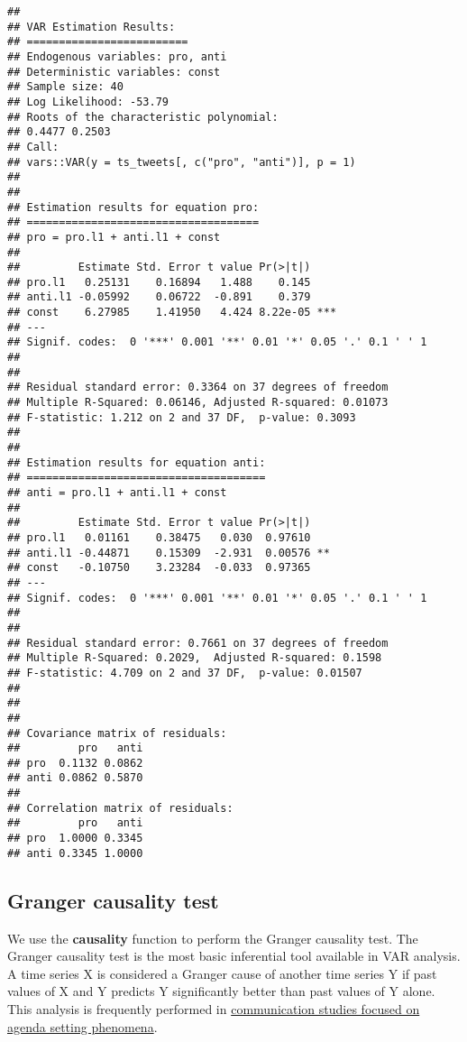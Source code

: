 \documentclass[
]{article}
\begin{document}
\begin{verbatim}
## 
## VAR Estimation Results:
## ========================= 
## Endogenous variables: pro, anti 
## Deterministic variables: const 
## Sample size: 40 
## Log Likelihood: -53.79 
## Roots of the characteristic polynomial:
## 0.4477 0.2503
## Call:
## vars::VAR(y = ts_tweets[, c("pro", "anti")], p = 1)
## 
## 
## Estimation results for equation pro: 
## ==================================== 
## pro = pro.l1 + anti.l1 + const 
## 
##         Estimate Std. Error t value Pr(>|t|)    
## pro.l1   0.25131    0.16894   1.488    0.145    
## anti.l1 -0.05992    0.06722  -0.891    0.379    
## const    6.27985    1.41950   4.424 8.22e-05 ***
## ---
## Signif. codes:  0 '***' 0.001 '**' 0.01 '*' 0.05 '.' 0.1 ' ' 1
## 
## 
## Residual standard error: 0.3364 on 37 degrees of freedom
## Multiple R-Squared: 0.06146, Adjusted R-squared: 0.01073 
## F-statistic: 1.212 on 2 and 37 DF,  p-value: 0.3093 
## 
## 
## Estimation results for equation anti: 
## ===================================== 
## anti = pro.l1 + anti.l1 + const 
## 
##         Estimate Std. Error t value Pr(>|t|)   
## pro.l1   0.01161    0.38475   0.030  0.97610   
## anti.l1 -0.44871    0.15309  -2.931  0.00576 **
## const   -0.10750    3.23284  -0.033  0.97365   
## ---
## Signif. codes:  0 '***' 0.001 '**' 0.01 '*' 0.05 '.' 0.1 ' ' 1
## 
## 
## Residual standard error: 0.7661 on 37 degrees of freedom
## Multiple R-Squared: 0.2029,  Adjusted R-squared: 0.1598 
## F-statistic: 4.709 on 2 and 37 DF,  p-value: 0.01507 
## 
## 
## 
## Covariance matrix of residuals:
##         pro   anti
## pro  0.1132 0.0862
## anti 0.0862 0.5870
## 
## Correlation matrix of residuals:
##         pro   anti
## pro  1.0000 0.3345
## anti 0.3345 1.0000
\end{verbatim}

\subsection{Granger causality test}\label{granger-causality-test}

We use the \textbf{causality} function to perform the Granger causality test. The Granger causality test is the most basic inferential tool available in VAR analysis. A time series X is considered a Granger cause of another time series Y if past values of X and Y predicts Y significantly better than past values of Y alone. This analysis is frequently performed in \href{https://scholar.google.com/scholar?hl=en&as_sdt=0\%2C5&q=\%28\%22granger+causality+test\%22+OR+\%22granger+test\%22\%29+AND+\%22agenda+setting\%22&btnG=}{communication studies focused on agenda setting phenomena}.
\end{document}
